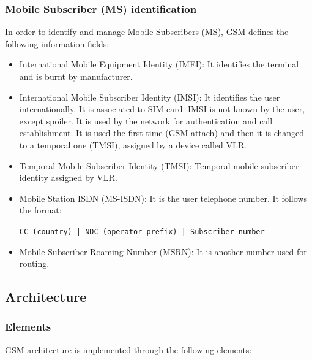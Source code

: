 \documentclass[
	12pt,
	twoside
]{book}
\begin{document}
\subsubsection{Mobile Subscriber (MS) identification}

In order to identify and manage Mobile Subscribers (MS), GSM defines the following information fields:

\begin{itemize}
	\item International Mobile Equipment Identity (IMEI): It identifies the terminal and is burnt by manufacturer.
	\item International Mobile Subscriber Identity (IMSI): It identifies the user internationally. It is associated to SIM card. IMSI is not known by the user, except spoiler. It is used by the network for authentication and call establishment. It is used the first time (GSM attach) and then it is changed to a temporal one (TMSI), assigned by a device called VLR.
	\item Temporal Mobile Subscriber Identity (TMSI): Temporal mobile subscriber identity assigned by VLR.
	\item {
		Mobile Station ISDN (MS-ISDN): It is the user telephone number. It follows the format:

		\texttt{CC (country) | NDC (operator prefix) | Subscriber number}
	}
	\item Mobile Subscriber Roaming Number (MSRN): It is another number used for routing.
\end{itemize}

\subsection{Architecture}

\subsubsection{Elements}

GSM architecture is implemented through the following elements:
\end{document}
